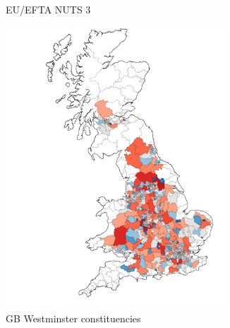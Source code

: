 \begin{figure}[tbp]
\begin{subfigure}[b]{0.48\textwidth}
         \caption{EU/EFTA NUTS 3}
         \label{appfig:mapb}
     \end{subfigure}
	\vspace{0.5cm}     
     
      \begin{subfigure}[b]{0.48\textwidth}
         \centering
         \includegraphics[width=0.9\textwidth]{./appendices/figures/gbw_lowres.pdf}
         \caption{GB Westminster constituencies}
         \label{appfig:mapc}
     \end{subfigure}
  	\hfill
      \begin{subfigure}[b]{0.48\textwidth}
         \centering

\end{subfigure}
\end{figure}
